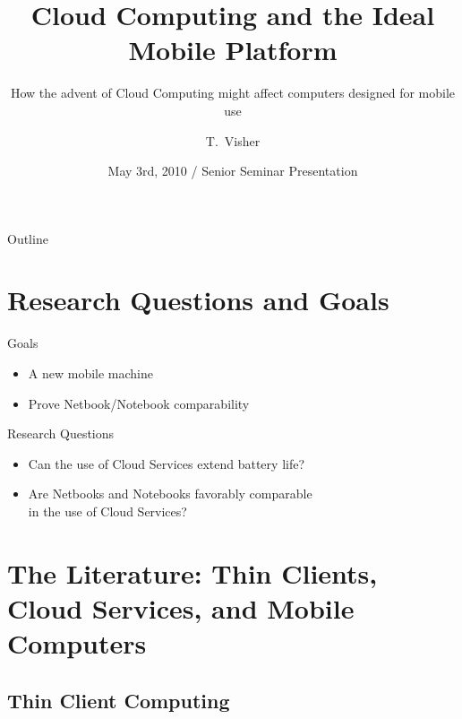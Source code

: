 \documentclass{beamer}
\title{Cloud Computing and the Ideal Mobile Platform}
\subtitle{How the advent of Cloud Computing might affect computers designed for
  mobile use}
\author{T.~Visher}
\institute[Chestnut Hill College]{Department of Computer Science\\
  Chestnut Hill College}
\date[Senior Seminar]{May 3rd, 2010 / Senior Seminar Presentation}
\begin{document}
\begin{frame}
\titlepage
\end{frame}

\begin{frame}{Outline}
\tableofcontents[pausesections]
\end{frame}



\section[Introduction]{Research Questions and Goals}

\begin{frame}{Goals}

\begin{itemize}
  \item A new mobile machine
  \item Prove Netbook/Notebook comparability
\end{itemize}

\end{frame}

\begin{frame}{Research Questions}
  \begin{itemize}
  \item Can the use of Cloud Services extend battery life?
  \item Are Netbooks and Notebooks favorably comparable \\ in the use of Cloud
    Services?
  \end{itemize}
\end{frame}

\section[Literature Review]{The Literature: Thin Clients, Cloud Services, and Mobile Computers}

\subsection{Thin Client Computing}
\end{document}
